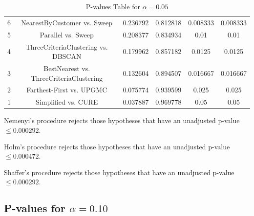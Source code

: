 \documentclass[a4paper,10pt]{article}
\begin{document}
\begin{landscape}
\begin{table}[!htp]
\begin{tabular}{cccccc}
6&NearestByCustomer vs. Sweep&0.236792&0.812818&0.008333&0.008333\\
5&Parallel vs. Sweep&0.208377&0.834934&0.01&0.01\\
4&ThreeCriteriaClustering vs. DBSCAN&0.179962&0.857182&0.0125&0.0125\\
3&BestNearest vs. ThreeCriteriaClustering&0.132604&0.894507&0.016667&0.016667\\
2&Farthest-First vs. UPGMC&0.075774&0.939599&0.025&0.025\\
1&Simplified vs. CURE&0.037887&0.969778&0.05&0.05\\
\hline
\end{tabular}
\caption{P-values Table for $\alpha=0.05$}
\end{table}Nemenyi's procedure rejects those hypotheses that have an unadjusted p-value $\le0.000292$.

Holm's procedure rejects those hypotheses that have an unadjusted p-value $\le0.000472$.

Shaffer's procedure rejects those hypotheses that have an unadjusted p-value $\le0.000292$.

\pagebreak

\subsection{P-values for $\alpha=0.10$}


\end{landscape}
\end{document}
